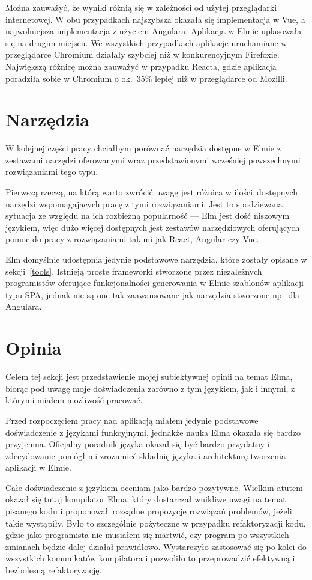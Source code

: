 \documentclass[twoside,a4paper]{report}
\begin{document}
Można zauważyć, że wyniki różnią się w zależności od użytej przeglądarki internetowej.
W obu przypadkach najszybsza okazała się implementacja w Vue, a najwolniejsza implementacja z użyciem Angulara.
Aplikacja w Elmie uplasowała się na drugim miejscu.
We wszystkich przypadkach aplikacje uruchamiane w przeglądarce Chromium działały szybciej niż w konkurencyjnym Firefoxie.
Największą różnicę można zauważyć w przypadku Reacta, gdzie aplikacja poradziła sobie w Chromium o ok.~35\% lepiej niż w przeglądarce od Mozilli.

\section{Narzędzia}
W kolejnej części pracy chciałbym porównać narzędzia dostępne w Elmie z zestawami narzędzi oferowanymi wraz przedstawionymi wcześniej powszechnymi rozwiązaniami tego typu.

Pierwszą rzeczą, na którą warto zwrócić uwagę jest różnica w ilości dostępnych narzędzi wspomagających pracę z tymi rozwiązaniami.
Jest to spodziewana sytuacja ze względu na ich rozbieżną popularność --- Elm jest dość niszowym językiem, więc dużo więcej dostępnych jest zestawów narzędziowych oferujących pomoc do pracy z rozwiązaniami takimi jak React, Angular czy Vue.

Elm domyślnie udostępnia jedynie podstawowe narzędzia, które zostały opisane w sekcji~\ref{tools}.
Istnieją proste frameworki stworzone przez niezależnych programistów oferujące funkcjonalności generowania w Elmie szablonów aplikacji typu SPA, jednak nie są one tak zaawansowane jak narzędzia stworzone np.~dla Angulara.

\section{Opinia}
Celem tej sekcji jest przedstawienie mojej subiektywnej opinii na temat Elma, biorąc pod uwagę moje doświadczenia zarówno z tym językiem, jak i innymi, z którymi miałem możliwość pracować.

Przed rozpoczęciem pracy nad aplikacją miałem jedynie podstawowe doświadczenie z językami funkcyjnymi, jednakże nauka Elma okazała się bardzo przyjemna.
Oficjalny poradnik języka okazał się być bardzo przydatny i zdecydowanie pomógł mi zrozumieć składnię języka i architekturę tworzenia aplikacji w Elmie.

Całe doświadczenie z językiem oceniam jako bardzo pozytywne.
Wielkim atutem okazał się tutaj kompilator Elma, który dostarczał wnikliwe uwagi na temat pisanego kodu i proponował rozsądne propozycje rozwiązań problemów, jeżeli takie wystąpiły.
Było to szczególnie pożyteczne w przypadku refaktoryzacji kodu, gdzie jako programista nie musiałem się martwić, czy program po wszystkich zmianach będzie dalej działał prawidłowo.
Wystarczyło zastosować się po kolei do wszystkich komunikatów kompilatora i pozwoliło to przeprowadzić efektywną i bezbolesną refaktoryzację.
\end{document}
